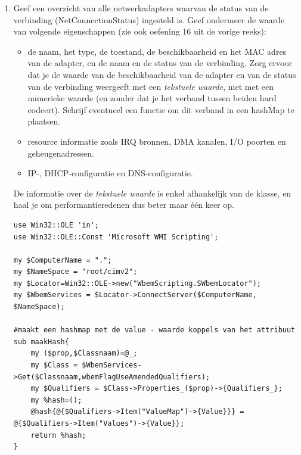 \documentclass[11pt,a4paper]{report}
\begin{document}
\begin{enumerate}[resume]
\begin{lstlisting}
#enkel specifieke attributen
foreach my $prop (in $Class->{Properties_}){
	my $Qualifiers = $prop->{Qualifiers_};
	if ($Qualifiers->{ValueMap}){
		print "\n",$prop->{name} ;
		print "\nDescription : ",$Qualifiers->Item("Description")->{Value};
		my %hash;
		@hash{@{$Qualifiers->Item("ValueMap")->{Value}}} = @{$Qualifiers->Item("Values")->{Value}}; #koppelen in een hash
		while (($key,$value)=each(%hash)){ 
			printf "\n %30s: %s",$key,$value;
		}
		print "\n----------------------------------------------";
	}
}
	\end{lstlisting}
	\item Geef een overzicht van alle netwerkadapters waarvan de status van de verbinding (NetConnectionStatus) ingesteld is. Geef ondermeer de waarde van volgende eigenschappen (zie ook oefening 16 uit de vorige reeks):
	\begin{itemize}	
		\item de naam, het type, de toestand, de beschikbaarheid en het MAC adres van de adapter, en de naam en de status van de verbinding. Zorg ervoor dat je de waarde van de beschikbaarheid van de adapter en van de status van de verbinding weergeeft met een \textit{tekstuele waarde}, niet met een numerieke waarde (en zonder dat je het verband tussen beiden hard codeert). Schrijf eventueel een functie om dit verband in een hashMap te plaatsen.
		\item resource informatie zoals IRQ bronnen, DMA kanalen, I/O poorten en geheugenadressen.
		\item IP-, DHCP-configuratie en DNS-configuratie.
	\end{itemize}
	De informatie over de \textit{tekstuele waarde} is enkel afhankelijk van de klasse, en haal je om performantieredenen dus beter maar één keer op.
	\begin{lstlisting}
use Win32::OLE 'in';
use Win32::OLE::Const 'Microsoft WMI Scripting';

my $ComputerName = ".";
my $NameSpace = "root/cimv2";
my $Locator=Win32::OLE->new("WbemScripting.SWbemLocator");
my $WbemServices = $Locator->ConnectServer($ComputerName, $NameSpace);

#maakt een hashmap met de value - waarde koppels van het attribuut
sub maakHash{
	my ($prop,$Classnaam)=@_;
	my $Class = $WbemServices->Get($Classnaam,wbemFlagUseAmendedQualifiers);
	my $Qualifiers = $Class->Properties_($prop)->{Qualifiers_};
	my %hash=();
	@hash{@{$Qualifiers->Item("ValueMap")->{Value}}} = @{$Qualifiers->Item("Values")->{Value}};
	return %hash;
}


\end{lstlisting}
\end{enumerate}
\end{document}

